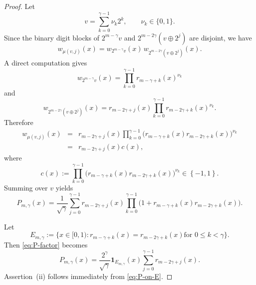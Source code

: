 \documentclass[10pt,a4paper]{amsart}
\begin{document}
\begin{proof}
Let 
\begin{equation*}
v=\sum_{k=0}^{\gamma -1}\nu _{k}2^{k},\qquad \nu _{k}\in \{0,1\}.
\end{equation*}%
Since the binary digit blocks of $2^{m-\gamma }v$ and $2^{m-2\gamma
}(v\oplus 2^{j})$ are disjoint, we have 
\begin{equation*}
w_{\mu (v,j)}(x)=w_{2^{m-\gamma }v}(x)\,w_{2^{m-2\gamma }(v\oplus 2^{j})}(x).
\end{equation*}%
A direct computation gives 
\begin{equation*}
w_{2^{m-\gamma }v}(x)=\prod_{k=0}^{\gamma -1}r_{m-\gamma +k}(x)^{\nu _{k}}
\end{equation*}%
and 
\begin{equation*}
w_{2^{m-2\gamma }(v\oplus 2^{j})}(x)=r_{m-2\gamma +j}(x)\prod_{k=0}^{\gamma
-1}r_{m-2\gamma +k}(x)^{\nu _{k}}.
\end{equation*}%
Therefore 
\begin{eqnarray*}
w_{\mu (v,j)}(x) &=&r_{m-2\gamma +j}(x)\prod_{k=0}^{\gamma -1}\bigl(%
r_{m-\gamma +k}(x)r_{m-2\gamma +k}(x)\bigr)^{\nu _{k}} \\
&=&r_{m-2\gamma +j}(x)c\left( x\right) ,
\end{eqnarray*}%
where%
\begin{equation*}
c\left( x\right) :=\prod_{k=0}^{\gamma -1}\bigl(r_{m-\gamma
+k}(x)r_{m-2\gamma +k}(x)\bigr)^{\nu _{k}}\in \left\{ -1,1\right\} .
\end{equation*}%
Summing over $v$ yields 
\begin{equation}
P_{m,\gamma }(x)=\frac{1}{\sqrt{\gamma }}\sum_{j=0}^{\gamma -1}r_{m-2\gamma
+j}(x)\prod_{k=0}^{\gamma -1}\bigl(1+r_{m-\gamma +k}(x)r_{m-2\gamma +k}(x)%
\bigr).  \label{eq:P-factor}
\end{equation}

Let 
\begin{equation*}
E_{m,\gamma}:=\bigl\{x\in[0,1): r_{m-\gamma+k}(x)=r_{m-2\gamma+k}(x)\text{
for }0\le k<\gamma\bigr\}.
\end{equation*}
Then \eqref{eq:P-factor} becomes 
\begin{equation}  \label{eq:P-on-E}
P_{m,\gamma}(x)=\frac{2^{\gamma}}{\sqrt{\gamma}}\mathbf{1}%
_{E_{m,\gamma}}(x)\sum_{j=0}^{\gamma-1} r_{m-2\gamma+j}(x).
\end{equation}
Assertion~(ii) follows immediately from \eqref{eq:P-on-E}.


\end{proof}
\end{document}
